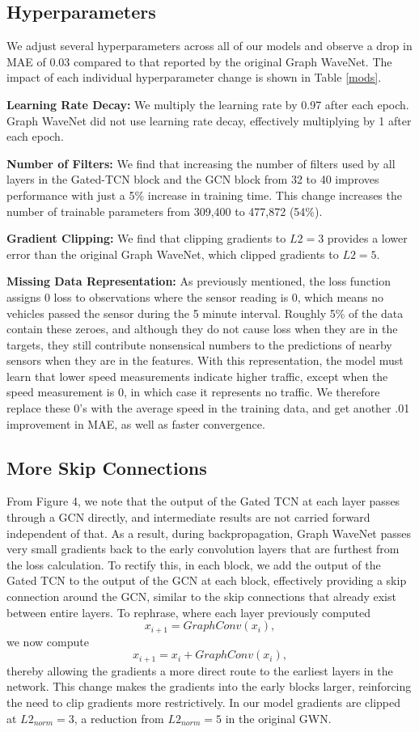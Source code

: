 \documentclass[10pt]{article}
\begin{document}
\subsection{Hyperparameters}

We adjust several hyperparameters across all of our models and observe a drop in MAE of 0.03 compared to that reported by the original Graph WaveNet. The impact of each individual hyperparameter change is shown in Table \ref{mods}.

\textbf{Learning Rate Decay:} We multiply the learning rate by 0.97 after each epoch. Graph WaveNet did not use learning rate decay, effectively multiplying by 1 after each epoch.

\textbf{Number of Filters:} We find that increasing the number of filters used by all layers in the Gated-TCN block and the GCN block from 32 to 40 improves performance with just a 5\% increase in training time. This change increases the number of trainable parameters from 309,400 to 477,872 (54\%).

\textbf{Gradient Clipping:} We find that clipping gradients to $L2 = 3$ provides a lower error than the original Graph WaveNet, which clipped gradients to $L2 = 5$. 

\textbf{Missing Data Representation:} As previously mentioned, the loss function assigns 0 loss to observations where the sensor reading is 0, which means no vehicles passed the sensor during the 5 minute interval. Roughly 5\% of the data contain these zeroes, and although they do not cause loss when they are in the targets,  they still contribute nonsensical numbers to the predictions of nearby sensors when they are in the features. With this representation,  the model must learn that lower speed measurements indicate higher traffic, except when the speed measurement is 0, in which case it represents no traffic. We therefore replace these 0's with the average speed in the training data, and get another .01 improvement in MAE, as well as faster convergence. 

\subsection{More Skip Connections}
From Figure 4, we note that the output of the Gated TCN at each layer passes through a GCN directly, and intermediate results are not carried forward independent of that. As a result, during backpropagation, Graph WaveNet passes very small gradients back to the early convolution layers that are furthest from the loss calculation. To rectify this, in each block, we add the output of the Gated TCN to the output of the GCN at each block, effectively providing a skip connection around the GCN, similar to the skip connections that already exist between entire layers. To rephrase, where each layer previously computed 
\[x_{i+1} = GraphConv(x_i),\]
we now compute \[x_{i+1} = x_i + GraphConv(x_i),\] thereby allowing the gradients a more direct route to the earliest layers in the network. This change makes the gradients into the early blocks larger, reinforcing the need to clip gradients more restrictively. In our model gradients are clipped at $L2_{norm}= 3$, a reduction from $L2_{norm}= 5$ in the original GWN.
\end{document}
